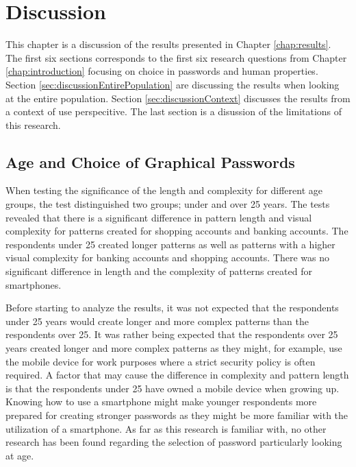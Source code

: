 \chapter{Discussion}\label{chap:discussion}

  This chapter is a discussion of the results presented in Chapter \ref{chap:results}. The first six sections corresponds to the first six research questions from 
  Chapter \ref{chap:introduction} focusing on choice in passwords and human properties. Section \ref{sec:discussionEntirePopulation} are 
  discussing the results when looking at the entire population. Section \ref{sec:discussionContext} discusses the results from 
  a context of use perspecitive. The last section is a disussion of the limitations of this research.

  \clearpage

  \section{Age and Choice of Graphical Passwords}

    When testing the significance of the length and complexity for different age groups, the test distinguished two groups; under and over 25 years. The tests revealed that there is a significant difference in pattern length and visual complexity for patterns created for shopping accounts and banking accounts. The respondents under 25 created longer patterns as well as patterns with a higher visual complexity for banking accounts and shopping accounts. There was no significant difference in length and the complexity of patterns created for smartphones. 

    Before starting to analyze the results, it was not expected that the respondents under 25 years would create longer and more complex patterns than the respondents over 25. It was rather being expected that the respondents over 25 years created longer and more complex patterns as they might, for example, use the mobile device for work purposes where a strict security policy is often required. A factor that may cause the difference in complexity and pattern length is that the respondents under 25 have owned a mobile device when growing up. Knowing how to use a smartphone might make younger respondents more prepared for creating stronger passwords as they might be more familiar with the utilization of a smartphone. As far as this research is familiar with, no other research has been found regarding the selection of password particularly looking at age.

